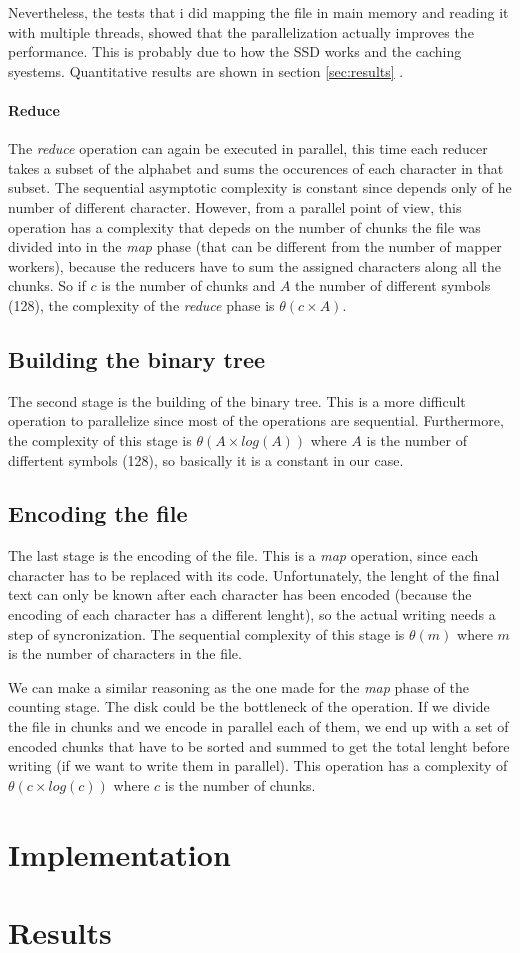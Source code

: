 \documentclass[12pt, letterpaper]{article}  %
\begin{document}
Nevertheless, the tests that i did mapping the file in main memory and reading it with multiple threads, showed that the parallelization
actually improves the performance. This is probably due to how the SSD works and the caching syestems. Quantitative results 
are shown in section \ref{sec:results} .

\paragraph*{Reduce}
The \textit{reduce} operation can again be executed in parallel, this 
time each reducer takes a subset of the alphabet and sums the occurences of each character in that subset. The sequential
asymptotic complexity is constant since depends only of he number of different character. However, from a parallel point of view, this operation 
has a complexity that depeds on the number of chunks the file was divided into in the \textit{map} phase (that can be different from the number of
mapper workers), because the reducers have to sum the assigned characters along all the chunks. So if $c$ is the number of chunks and $A$ the number
of different symbols (128), the complexity of the \textit{reduce} phase is $\theta(c \times A)$.

\subsection{Building the binary tree}
The second stage is the building of the binary tree. This is a more difficult operation to parallelize since 
most of the operations are sequential. Furthermore, the complexity of this stage is $\theta(A \times log (A))$  where 
$A$ is the number of differtent symbols (128), so basically it is a constant in our case.

\subsection{Encoding the file}
The last stage is the encoding of the file. This is a \textit{map} operation, since each character has to be replaced with its code.
Unfortunately, the lenght of the final text can only be known after each character has been encoded (because the encoding of each character
has a different lenght), so the actual writing needs a step of syncronization. The sequential complexity of this stage is $\theta(m)$ where $m$ is 
the number of characters in the file.

We can make a similar reasoning as the one made for the \textit{map} phase of the counting stage. The disk could be the bottleneck of the operation.
If we divide the file in chunks and we encode in parallel each of them, we end up with a set of encoded chunks that have to be sorted and summed to 
get the total lenght before writing (if we want to write them in parallel). This operation has a complexity of $\theta(c \times log(c))$ where $c$ is the number of chunks.


\section{Implementation}


\section{Results \label{sec:results}}



\newpage \FloatBarrier


\end{document}
